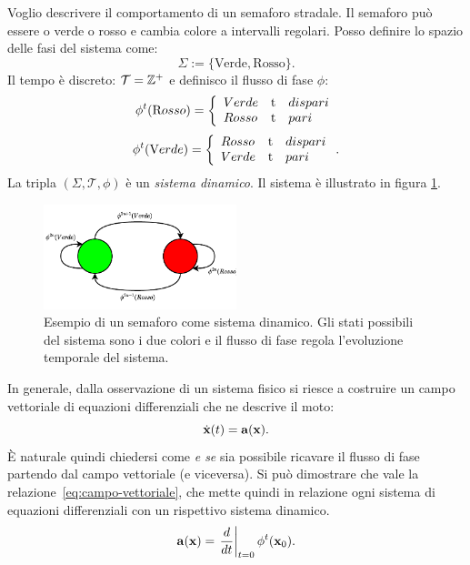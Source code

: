 \begin{example}
    \label{ex:semaforo}
    Voglio descrivere il comportamento di un semaforo stradale.
    Il semaforo può essere o verde o rosso e cambia colore a intervalli regolari.
    Posso definire lo spazio delle fasi del sistema come:
    \begin{equation*}
        \Sigma := \{\text{Verde}, \text{Rosso} \}.
    \end{equation*}
    Il tempo è discreto: $\mathcal T = \mathbb{Z}^+$ e definisco il flusso di fase $\phi$:
    \begin{equation*}
        \phi^t(\text Rosso) = \left\{
        \begin{array}{lrl}
            Verde &$t$ &dispari\\
            Rosso &$t$ &pari
        \end{array}
        \right.
    \end{equation*}
    \begin{equation*}
        \phi^t(\text Verde) = \left\{
        \begin{array}{lrl}
            Rosso &$t$ &dispari\\
            Verde &$t$ &pari
        \end{array}
        \right.
        .
    \end{equation*}
    La tripla $(\Sigma, \mathcal T, \phi)$ è un \emph{sistema dinamico}.
    Il sistema è illustrato in figura \ref{fig:esempio-semaforo}.
    \begin{figure}[H]
        \centering
        \includegraphics[width=0.5\textwidth]{assets/ex-semaforo}
        \caption[Semaforo]{Esempio di un semaforo come sistema dinamico.
        Gli stati possibili del sistema sono i due colori e il flusso di fase
        regola l'evoluzione temporale del sistema.}
        \label{fig:esempio-semaforo}
    \end{figure}
\end{example}


In generale, dalla osservazione di un sistema fisico si riesce a costruire un campo vettoriale
di equazioni differenziali che ne descrive il moto:
\begin{equation*}
    \dot {\mathbf{x}} (t) = \mathbf{a}(\mathbf{x}).
\end{equation*}
È naturale quindi chiedersi come \emph{e se} sia possibile ricavare il flusso di fase partendo
dal campo vettoriale (e viceversa).
Si può dimostrare  che vale la relazione~\eqref{eq:campo-vettoriale},
che mette quindi in relazione ogni sistema di equazioni differenziali con un rispettivo sistema dinamico.
\begin{equation}
    \mathbf{a} (\mathbf{x}) = \left.\frac d {dt} \right| _{t=0} \phi^t (\mathbf{x}_0).
    \label{eq:campo-vettoriale}
\end{equation}


